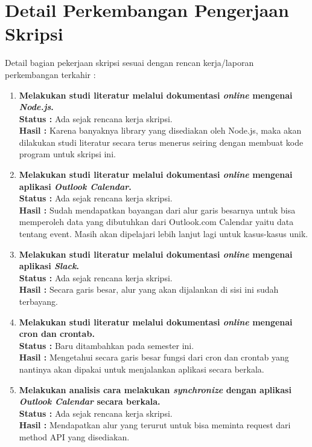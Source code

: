 \documentclass[a4paper,twoside]{article}
\begin{document}
\section{Detail Perkembangan Pengerjaan Skripsi}
Detail bagian pekerjaan skripsi sesuai dengan rencan kerja/laporan perkembangan terkahir :
	\begin{enumerate}
		\item \textbf{Melakukan studi literatur melalui dokumentasi \textit{online} mengenai \textit{Node.js}.}\\
		{\bf Status :} Ada sejak rencana kerja skripsi.\\
		{\bf Hasil :} Karena banyaknya library yang disediakan oleh Node.js, maka akan dilakukan studi literatur secara terus menerus seiring dengan membuat kode program untuk skripsi ini. 
		
		\item \textbf{Melakukan studi literatur melalui dokumentasi \textit{online} mengenai aplikasi \textit{Outlook Calendar}.}\\
		{\bf Status :} Ada sejak rencana kerja skripsi.\\
		{\bf Hasil :} Sudah mendapatkan bayangan dari alur garis besarnya untuk bisa memperoleh data yang dibutuhkan dari Outlook.com Calendar yaitu data tentang event. Masih akan dipelajari lebih lanjut lagi untuk kasus-kasus unik. 

		\item \textbf{Melakukan studi literatur melalui dokumentasi \textit{online} mengenai aplikasi \textit{Slack}.}\\
		{\bf Status :} Ada sejak rencana kerja skripsi.\\
		{\bf Hasil :} Secara garis besar, alur yang akan dijalankan di sisi ini sudah terbayang.

		\item \textbf{Melakukan studi literatur melalui dokumentasi \textit{online} mengenai cron dan crontab.}\\
		{\bf Status :} Baru ditambahkan pada semester ini.\\
		{\bf Hasil :} Mengetahui secara garis besar fungsi dari cron dan crontab yang nantinya akan dipakai untuk menjalankan aplikasi secara berkala.

		\item \textbf{Melakukan analisis cara melakukan \textit{synchronize} dengan aplikasi \textit{Outlook Calendar} secara berkala.}\\
		{\bf Status :} Ada sejak rencana kerja skripsi.\\
		{\bf Hasil :} Mendapatkan alur yang terurut untuk bisa meminta request dari method API yang disediakan. 


\end{enumerate}
\end{document}
